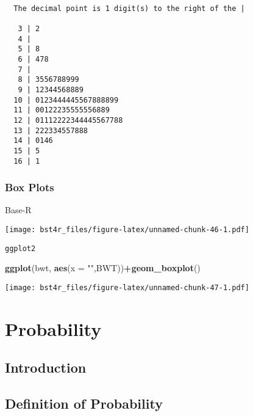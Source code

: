 \documentclass[12pt,]{article}
\newenvironment{Shaded}{\begin{snugshade}}{\end{snugshade}}
\newcommand{\KeywordTok}[1]{\textcolor[rgb]{0.13,0.29,0.53}{\textbf{#1}}}
\newcommand{\DataTypeTok}[1]{\textcolor[rgb]{0.13,0.29,0.53}{#1}}
\newcommand{\StringTok}[1]{\textcolor[rgb]{0.31,0.60,0.02}{#1}}
\newcommand{\OperatorTok}[1]{\textcolor[rgb]{0.81,0.36,0.00}{\textbf{#1}}}
\newcommand{\NormalTok}[1]{#1}
\theoremstyle{definition}
\theoremstyle{definition}
\theoremstyle{definition}
\theoremstyle{remark}
\begin{document}
\begin{verbatim}

  The decimal point is 1 digit(s) to the right of the |

   3 | 2
   4 | 
   5 | 8
   6 | 478
   7 | 
   8 | 3556788999
   9 | 12344568889
  10 | 0123444445567888899
  11 | 00122235555556889
  12 | 01112222344445567788
  13 | 222334557888
  14 | 0146
  15 | 5
  16 | 1
\end{verbatim}

\subsubsection{Box Plots}\label{box-plots}

Base-R

\begin{Shaded}
\end{Shaded}

\texttt{[image: bst4r\_files/figure-latex/unnamed-chunk-46-1.pdf]}

\texttt{ggplot2}

\begin{Shaded}
\begin{Highlighting}[]
\KeywordTok{ggplot}\NormalTok{(bwt, }\KeywordTok{aes}\NormalTok{(}\DataTypeTok{x =} \StringTok{""}\NormalTok{,BWT))}\OperatorTok{+}\KeywordTok{geom_boxplot}\NormalTok{()}
\end{Highlighting}
\end{Shaded}

\texttt{[image: bst4r\_files/figure-latex/unnamed-chunk-47-1.pdf]}

\section{Probability}\label{probability}

\subsection{Introduction}\label{introduction}

\subsection{Definition of Probability}\label{definition-of-probability}
\end{document}
